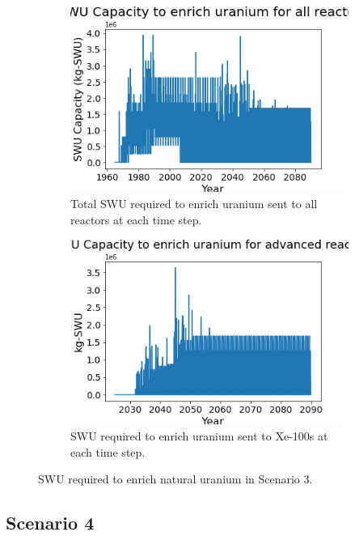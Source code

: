 \begin{figure}
    \centering
    \begin{subfigure}{0.4\textwidth}
        \centering
        \includegraphics[scale=0.3]{figures/totalswu_scenarios_3.png}
        \caption{Total \gls{SWU} required to enrich uranium sent to all reactors at each time step.}
        \label{fig:totalswu_3}
    \end{subfigure}
    \begin{subfigure}{0.4\textwidth}
        \centering
        \includegraphics[scale=0.3]{figures/haleuSWU_scenarios_3.png}
        \caption{\gls{SWU} required to enrich uranium sent to Xe-100s at each time step.}
        \label{fig:haleuswu_3}
    \end{subfigure}
    \caption{\gls{SWU} required to enrich natural uranium in Scenario 3.}
    \label{fig:swu_3}
\end{figure}

\subsection{Scenario 4}

